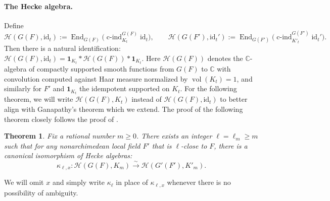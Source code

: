 \documentclass[american]{article}
\numberwithin{equation}{section}
\numberwithin{figure}{section}
\theoremstyle{plain}
\newtheorem{theorem}{Theorem}[section]
\theoremstyle{definition}
\theoremstyle{remark}
\DeclareMathOperator{\vol}{vol}
\DeclareMathOperator{\End}{End}
\DeclareMathOperator{\cind}{c-ind}
\newcommand{\cH}{\mathcal{H}}
\newcommand{\id}{\mathrm{id}}
\begin{document}
\paragraph{The Hecke algebra.}
Define
\[
\cH(G(F),\id_t) := \End_{G(F)}\!\bigl(\cind_{K_t}^{G(F)}\id_t\bigr), \qquad \cH(G(F'),\id_t') := \End_{G(F')}\!\bigl(\cind_{K'_t}^{G(F')}\id_t'\bigr).
\]
Then there is a natural identification: $\cH(G(F),\id_t)=\mathbf{1}_{K_t}* \cH(G(F))\!*\mathbf{1}_{K_t}$. Here $\cH(G(F))$ denotes the $\mathbb{C}$-algebra of compactly supported smooth functions from $G(F)$ to $\mathbb{C}$ with convolution computed against Haar measure normalized by $\vol(K_t)=1$, and similarly for $F'$ and \(\mathbf{1}_{K_t}\) the idempotent supported on \(K_t\). For the following theorem, we will write $\cH(G(F),K_t)$ instead of $\cH(G(F),\id_t)$ to better align with Ganapathy's theorem which we extend. The proof of the following theorem closely follows the proof of \cite[Theorem 4.1]{ganapathy2022}.

\begin{theorem}\label{thm:deligne-kazhdan-Hecke-isomorphism}
Fix a rational number $m \geq 0$. There exists an integer $\ell=\ell_m \geq m$ such that for any nonarchimedean local field $F'$ that is $\ell$-close to $F$, there is a canonical isomorphism of Hecke algebras:
\[
\kappa_{\ell,x}: \mathscr{H}(G(F), K_m) \xrightarrow{\sim} \mathscr{H}(G'(F'), K'_m).
\]
\end{theorem}
We will omit \(x\) and simply write \(\kappa_\ell\) in place of \(\kappa_{\ell,x}\) whenever there is no possibility of ambiguity. 
\end{document}
